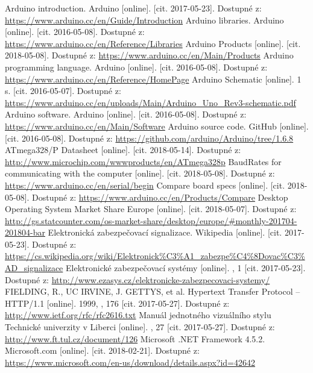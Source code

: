\documentclass[FM,DP]{tulthesis}  %
\begin{document}
\begin{thebibliography}{10}
Arduino introduction. Arduino [online]. [cit. 2017-05-23]. Dostupné z: \url{https://www.arduino.cc/en/Guide/Introduction}
Arduino libraries. Arduino [online]. [cit. 2016-05-08]. Dostupné z: \url{https://www.arduino.cc/en/Reference/Libraries}
Arduino Products [online]. [cit. 2018-05-08]. Dostupné z: \url{https://www.arduino.cc/en/Main/Products}
Arduino programming language. Arduino [online]. [cit. 2016-05-08]. Dostupné z: \url{https://www.arduino.cc/en/Reference/HomePage}
Arduino Schematic [online]. 1 s. [cit. 2016-05-07]. Dostupné z: \url{https://www.arduino.cc/en/uploads/Main/Arduino\_Uno\_Rev3-schematic.pdf}
 Arduino software. Arduino [online]. [cit. 2016-05-08]. Dostupné z: \url{https://www.arduino.cc/en/Main/Software}
Arduino source code. GitHub [online]. [cit. 2016-05-08]. Dostupné z: \url{https://github.com/arduino/Arduino/tree/1.6.8}
 ATmega328/P Datasheet [online]. [cit. 2018-05-14]. Dostupné z: \url{http://www.microchip.com/wwwproducts/en/ATmega328p}
BaudRates for communicating with the computer [online]. [cit. 2018-05-08]. Dostupné z: \url{https://www.arduino.cc/en/serial/begin}
Compare board specs [online]. [cit. 2018-05-08]. Dostupné z: \url{https://www.arduino.cc/en/Products/Compare}
Desktop Operating System Market Share Europe [online]. [cit. 2018-05-07]. Dostupné z: \url{http://gs.statcounter.com/os-market-share/desktop/europe/#monthly-201704-201804-bar}
Elektronická zabezpečovací signalizace. Wikipedia [online]. [cit. 2017-05-23]. Dostupné z: \url{https://cs.wikipedia.org/wiki/Elektronick\%C3\%A1\_zabezpe\%C4\%8Dovac\%C3\%AD_signalizace}
Elektronické zabezpečovací systémy [online]. , 1 [cit. 2017-05-23]. Dostupné z: \url{http://www.ezasys.cz/elektronicke-zabezpecovaci-systemy/}
FIELDING, R., UC IRVINE, J. GETTYS, et al. Hypertext Transfer Protocol -- HTTP/1.1 [online]. 1999, , 176 [cit. 2017-05-27]. Dostupné z: \url{http://www.ietf.org/rfc/rfc2616.txt}
Manuál jednotného vizuálního stylu Technické univerzity v Liberci [online]. , 27 [cit. 2017-05-27]. Dostupné z: \url{http://www.ft.tul.cz/document/126}
Microsoft .NET Framework 4.5.2. Microsoft.com [online]. [cit. 2018-02-21]. Dostupné z: \url{https://www.microsoft.com/en-us/download/details.aspx?id=42642}

\end{thebibliography}
\end{document}
